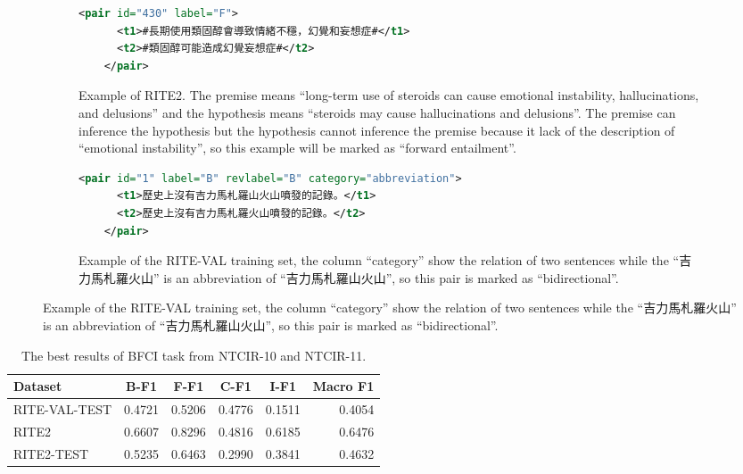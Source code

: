 \documentclass[12pt]{article}
\begin{document}
\begin{CJK*}{UTF8}{bkai}
\begin{spacing}{1.77}
\begin{figure}[ht!]
  \centering
  \caption{The examples of RITE2 and RITE-VAL}
  \begin{subfigure}{1\linewidth}
    \caption{Example of RITE2. The premise means ``long-term use of steroids can cause emotional instability, hallucinations, and delusions'' and the hypothesis means ``steroids may cause hallucinations and delusions''. The premise can inference the hypothesis but the hypothesis cannot inference the premise because it lack of the description of ``emotional instability'', so this example will be marked as ``forward entailment''.}
    \begin{minipage}{\linewidth}
    \begin{lstlisting}[language=XML]
    <pair id="430" label="F">
      <t1>#長期使用類固醇會導致情緒不穩，幻覺和妄想症#</t1>
      <t2>#類固醇可能造成幻覺妄想症#</t2>
    </pair>
    \end{lstlisting}
    \end{minipage}
  \end{subfigure}

  \begin{subfigure}{1\linewidth}
    \caption{Example of the RITE-VAL training set, the column ``category'' show the relation of two sentences while the ``吉力馬札羅火山'' is an abbreviation of ``吉力馬札羅山火山'', so this pair is marked as ``bidirectional''.}
    \begin{minipage}{\linewidth}
    \begin{lstlisting}[language=XML]
    <pair id="1" label="B" revlabel="B" category="abbreviation">
      <t1>歷史上沒有吉力馬札羅山火山噴發的記錄。</t1>
      <t2>歷史上沒有吉力馬札羅火山噴發的記錄。</t2>
    </pair>
    \end{lstlisting}
    \end{minipage}
  \end{subfigure}
\end{figure}


\begin{table}[H]
  \centering
  \setlength{\extrarowheight}{-3pt}
  \begin{tabular}{|l|r|r|r|r|r|}
  \hline
   Dataset & \multicolumn{1}{c|}{B-F1} & \multicolumn{1}{c|}{F-F1} & \multicolumn{1}{c|}{C-F1} & \multicolumn{1}{c|}{I-F1} & \multicolumn{1}{c|}{Macro F1} \\ \hline
  RITE-VAL-TEST & 0.4721 & 0.5206 & 0.4776 & 0.1511 & 0.4054 \\ \hline
  RITE2 & 0.6607 & 0.8296 & 0.4816 & 0.6185 & 0.6476 \\ \hline
  RITE2-TEST & 0.5235 & 0.6463 & 0.2990 & 0.3841 & 0.4632 \\ \hline
  \end{tabular}
  \caption{The best results of BFCI task from NTCIR-10 and NTCIR-11.}
  \label{result:bfci_ntcir}
\end{table}


\end{spacing}
\end{CJK*}
\end{document}

